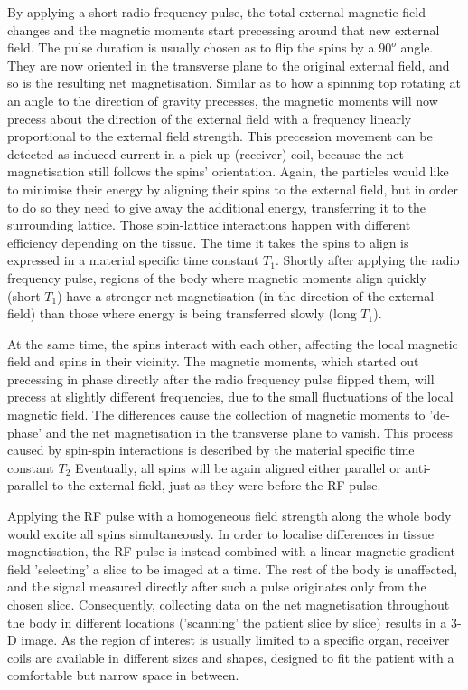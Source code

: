 By applying a short radio frequency pulse, the total external magnetic field changes and the magnetic moments start precessing around that new external field.
The pulse duration is usually chosen as to flip the spins by a $90^o$ angle.
They are now oriented in the transverse plane to the original external field, and so is the resulting net magnetisation.
Similar as to how a spinning top rotating at an angle to the direction of gravity precesses, the magnetic moments will now precess about the direction of the external field with a frequency linearly proportional to the external field strength.
This precession movement can be detected as induced current in a pick-up (receiver) coil, because the net magnetisation still follows the spins' orientation. 
Again, the particles would like to minimise their energy by aligning their spins to the external field, but in order to do so they need to give away the additional energy, transferring it to the surrounding lattice.
Those spin-lattice interactions happen with different efficiency depending on the tissue.
The time it takes the spins to align is expressed in a material specific time constant $T_1$.
Shortly after applying the radio frequency pulse, regions of the body where magnetic moments align quickly (short $T_1$) have a stronger net magnetisation (in the direction of the external field) than those where energy is being transferred slowly (long $T_1$).

At the same time, the spins interact with each other, affecting the local magnetic field and spins in their vicinity.
The magnetic moments, which started out precessing in phase directly after the radio frequency pulse flipped them, will precess at slightly different frequencies, due to the small fluctuations of the local magnetic field.
The differences cause the collection of magnetic moments to 'de-phase' and the net magnetisation in the transverse plane to vanish.
This process caused by spin-spin interactions is described by the material specific time constant $T_2$
Eventually, all spins will be again aligned either parallel or anti-parallel to the external field, just as they were before the RF-pulse.

Applying the RF pulse with a homogeneous field strength along the whole body would excite all spins simultaneously.
In order to localise differences in tissue magnetisation, the RF pulse is instead combined with a linear magnetic gradient field 'selecting' a slice to be imaged at a time.
The rest of the body is unaffected, and the signal measured directly after such a pulse originates only from the chosen slice.
Consequently, collecting data on the net magnetisation throughout the body in different locations ('scanning' the patient slice by slice) results in a 3-D image.
As the region of interest is usually limited to a specific organ, receiver coils are available in different sizes and shapes, designed to fit the patient with a comfortable but narrow space in between.

